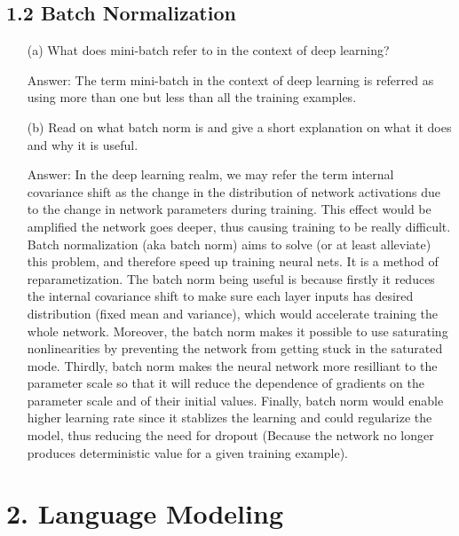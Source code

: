 \documentclass[12pt,letterpaper]{article}
\begin{document}
\subsection*{1.2 Batch Normalization}
\begin{itemize}
    \item[(a)]What does mini-batch refer to in the context of deep learning?
    
    Answer: The term mini-batch in the context of deep learning is referred as using more than one but less than all the training examples. 
    
    \item[(b)]Read on what batch norm is and give a short explanation on what it does and why it is useful.
    
    Answer: In the deep learning realm, we may refer the term internal covariance shift as the change in the distribution of network activations due to the change in network parameters during training. This effect would be amplified the network goes deeper, thus causing training to be really difficult. Batch normalization (aka batch norm) aims to solve (or at least alleviate) this problem, and therefore speed up training neural nets. It is a method of reparametization. The batch norm being useful is because firstly it reduces the internal covariance shift to make sure each layer inputs has desired distribution (fixed mean and variance), which would accelerate training the whole network. Moreover, the batch norm makes it possible to use saturating nonlinearities by preventing the network from getting stuck in the saturated mode. Thirdly, batch norm makes the neural network more resilliant to the parameter scale so that it will reduce the dependence of gradients on the parameter scale and of their initial values. Finally, batch norm would enable higher learning rate since it stablizes the learning and could regularize the model, thus reducing the need for dropout (Because the network no longer produces deterministic value for a given training example). 
\end{itemize}
\section*{2. Language Modeling}
\end{document}
